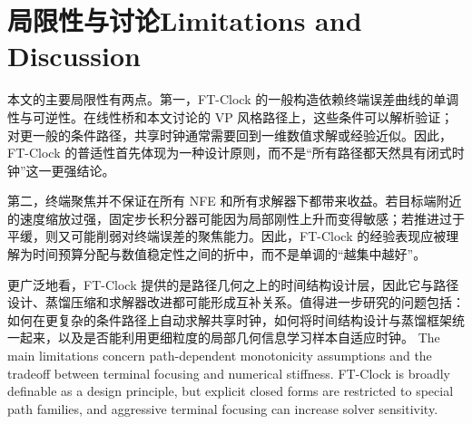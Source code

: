 \section{\ifinternalcn 局限性与讨论\else Limitations and Discussion\fi}

\ifinternalcn
本文的主要局限性有两点。第一，FT-Clock 的一般构造依赖终端误差曲线的单调性与可逆性。在线性桥和本文讨论的 VP 风格路径上，这些条件可以解析验证；对更一般的条件路径，共享时钟通常需要回到一维数值求解或经验近似。因此，FT-Clock 的普适性首先体现为一种设计原则，而不是“所有路径都天然具有闭式时钟”这一更强结论。

第二，终端聚焦并不保证在所有 NFE 和所有求解器下都带来收益。若目标端附近的速度缩放过强，固定步长积分器可能因为局部刚性上升而变得敏感；若推进过于平缓，则又可能削弱对终端误差的聚焦能力。因此，FT-Clock 的经验表现应被理解为时间预算分配与数值稳定性之间的折中，而不是单调的“越集中越好”。

更广泛地看，FT-Clock 提供的是路径几何之上的时间结构设计层，因此它与路径设计、蒸馏压缩和求解器改进都可能形成互补关系。值得进一步研究的问题包括：如何在更复杂的条件路径上自动求解共享时钟，如何将时间结构设计与蒸馏框架统一起来，以及是否能利用更细粒度的局部几何信息学习样本自适应时钟。
\else
The main limitations concern path-dependent monotonicity assumptions and the tradeoff between terminal focusing and numerical stiffness. FT-Clock is broadly definable as a design principle, but explicit closed forms are restricted to special path families, and aggressive terminal focusing can increase solver sensitivity.
\fi
